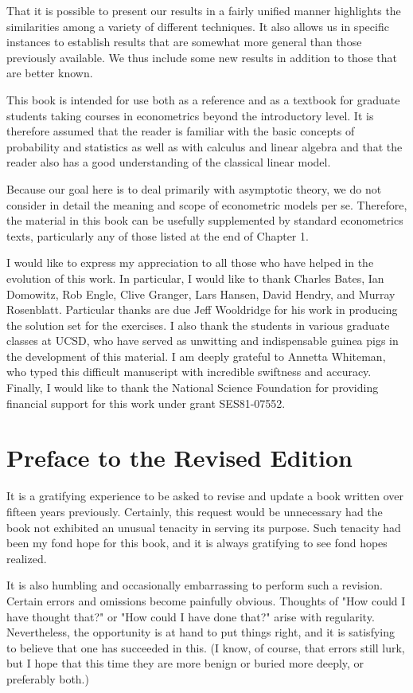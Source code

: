 \documentclass[10pt]{article}
\begin{document}
That it is possible to present our results in a fairly unified manner highlights the similarities among a variety of different techniques. It also allows us in specific instances to establish results that are somewhat more general than those previously available. We thus include some new results in addition to those that are better known.

This book is intended for use both as a reference and as a textbook for graduate students taking courses in econometrics beyond the introductory level. It is therefore assumed that the reader is familiar with the basic concepts of probability and statistics as well as with calculus and linear algebra and that the reader also has a good understanding of the classical linear model.

Because our goal here is to deal primarily with asymptotic theory, we do not consider in detail the meaning and scope of econometric models per se. Therefore, the material in this book can be usefully supplemented by standard econometrics texts, particularly any of those listed at the end of Chapter 1.

I would like to express my appreciation to all those who have helped in the evolution of this work. In particular, I would like to thank Charles Bates, Ian Domowitz, Rob Engle, Clive Granger, Lars Hansen, David Hendry, and Murray Rosenblatt. Particular thanks are due Jeff Wooldridge for his work in producing the solution set for the exercises. I also thank the students in various graduate classes at UCSD, who have served as unwitting and indispensable guinea pigs in the development of this material. I am deeply grateful to Annetta Whiteman, who typed this difficult manuscript with incredible swiftness and accuracy. Finally, I would like to thank the National Science Foundation for providing financial support for this work under grant SES81-07552.

\section*{Preface to the Revised Edition}
It is a gratifying experience to be asked to revise and update a book written over fifteen years previously. Certainly, this request would be unnecessary had the book not exhibited an unusual tenacity in serving its purpose. Such tenacity had been my fond hope for this book, and it is always gratifying to see fond hopes realized.

It is also humbling and occasionally embarrassing to perform such a revision. Certain errors and omissions become painfully obvious. Thoughts of "How could I have thought that?" or "How could I have done that?" arise with regularity. Nevertheless, the opportunity is at hand to put things right, and it is satisfying to believe that one has succeeded in this. (I know, of course, that errors still lurk, but I hope that this time they are more benign or buried more deeply, or preferably both.)
\end{document}
